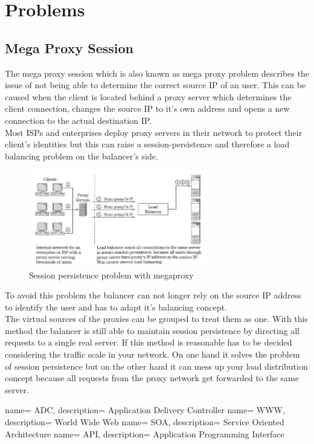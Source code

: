 \documentclass[12p]{article}
\begin{document}
	\newpage
	\section{Problems}
	\subsection{Mega Proxy Session}
	The mega proxy session which is also known as mega proxy problem describes the issue of not being able to determine the correct source IP of an user. This can be caused when the client is located behind a proxy server which determines the client connection, changes the source IP to it's own address and opens a new connection to the actual destination IP.\\
	Most ISPs and enterprises deploy proxy servers in their network to protect their client's identities but this can raise a session-persistence and therefore a load balancing problem on the balancer's side.
	\begin{figure}[h!]
		\centering
		\includegraphics[width=0.7\textwidth]{img/SessionPersistanceProblem.png}
		\caption{Session persistence problem with megaproxy \cite{lb_SFC}}
	\end{figure}
	To avoid this problem the balancer can not longer rely on the source IP address to identify the user and has to adapt it's balancing concept.\\
	The virtual sources of the proxies can be grouped to treat them as one. With this method the balancer is still able to maintain session persistence by directing all requests to a single real server. If this method is reasonable has to be decided considering the traffic scale in your network. On one hand it solves the problem of session persistence but on the other hand it can mess up your load distribution concept because all requests from the proxy network get forwarded to the same server.
	
	\newpage
	\listoffigures
	 {
		name= ADC,
		description= {Application Delivery Controller}
	}
	 {
		name= WWW,
		description= {World Wide Web}
	}
	 {
		name= SOA,
		description= {Service Oriented Architecture}
	}
	 {
		name= API,
		description= {Application Programming Interface}
	}
	\printglossaries
	
\end{document}
